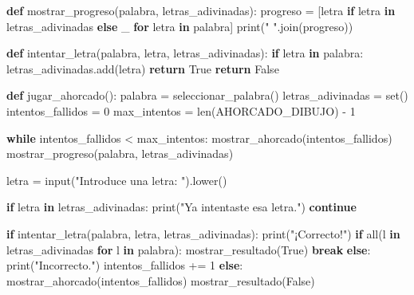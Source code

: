 \documentclass[
  a4paper,
  DIV=11,
  numbers=noendperiod,
  onepage,
  openany]{scrreprt}
\newenvironment{Shaded}{\begin{snugshade}}{\end{snugshade}}
\newcommand{\BuiltInTok}[1]{\textcolor[rgb]{0.00,0.23,0.31}{#1}}
\newcommand{\ControlFlowTok}[1]{\textcolor[rgb]{0.00,0.23,0.31}{\textbf{#1}}}
\newcommand{\DecValTok}[1]{\textcolor[rgb]{0.68,0.00,0.00}{#1}}
\newcommand{\KeywordTok}[1]{\textcolor[rgb]{0.00,0.23,0.31}{\textbf{#1}}}
\newcommand{\NormalTok}[1]{\textcolor[rgb]{0.00,0.23,0.31}{#1}}
\newcommand{\OperatorTok}[1]{\textcolor[rgb]{0.37,0.37,0.37}{#1}}
\newcommand{\StringTok}[1]{\textcolor[rgb]{0.13,0.47,0.30}{#1}}
\newcommand{\VariableTok}[1]{\textcolor[rgb]{0.07,0.07,0.07}{#1}}
\begin{document}
\begin{Shaded}
\begin{Highlighting}[]
\KeywordTok{def}\NormalTok{ mostrar\_progreso(palabra, letras\_adivinadas):}
\NormalTok{    progreso }\OperatorTok{=}\NormalTok{ [letra }\ControlFlowTok{if}\NormalTok{ letra }\KeywordTok{in}\NormalTok{ letras\_adivinadas }\ControlFlowTok{else} \StringTok{\textquotesingle{}\_\textquotesingle{}} \ControlFlowTok{for}\NormalTok{ letra }\KeywordTok{in}\NormalTok{ palabra]}
    \BuiltInTok{print}\NormalTok{(}\StringTok{" "}\NormalTok{.join(progreso))}

\KeywordTok{def}\NormalTok{ intentar\_letra(palabra, letra, letras\_adivinadas):}
    \ControlFlowTok{if}\NormalTok{ letra }\KeywordTok{in}\NormalTok{ palabra:}
\NormalTok{        letras\_adivinadas.add(letra)}
        \ControlFlowTok{return} \VariableTok{True}
    \ControlFlowTok{return} \VariableTok{False}

\KeywordTok{def}\NormalTok{ jugar\_ahorcado():}
\NormalTok{    palabra }\OperatorTok{=}\NormalTok{ seleccionar\_palabra()}
\NormalTok{    letras\_adivinadas }\OperatorTok{=} \BuiltInTok{set}\NormalTok{()}
\NormalTok{    intentos\_fallidos }\OperatorTok{=} \DecValTok{0}
\NormalTok{    max\_intentos }\OperatorTok{=} \BuiltInTok{len}\NormalTok{(AHORCADO\_DIBUJO) }\OperatorTok{{-}} \DecValTok{1}

    \ControlFlowTok{while}\NormalTok{ intentos\_fallidos }\OperatorTok{\textless{}}\NormalTok{ max\_intentos:}
\NormalTok{        mostrar\_ahorcado(intentos\_fallidos)}
\NormalTok{        mostrar\_progreso(palabra, letras\_adivinadas)}
        
\NormalTok{        letra }\OperatorTok{=} \BuiltInTok{input}\NormalTok{(}\StringTok{"Introduce una letra: "}\NormalTok{).lower()}
        
        \ControlFlowTok{if}\NormalTok{ letra }\KeywordTok{in}\NormalTok{ letras\_adivinadas:}
            \BuiltInTok{print}\NormalTok{(}\StringTok{"Ya intentaste esa letra."}\NormalTok{)}
            \ControlFlowTok{continue}
        
        \ControlFlowTok{if}\NormalTok{ intentar\_letra(palabra, letra, letras\_adivinadas):}
            \BuiltInTok{print}\NormalTok{(}\StringTok{"¡Correcto!"}\NormalTok{)}
            \ControlFlowTok{if} \BuiltInTok{all}\NormalTok{(l }\KeywordTok{in}\NormalTok{ letras\_adivinadas }\ControlFlowTok{for}\NormalTok{ l }\KeywordTok{in}\NormalTok{ palabra):}
\NormalTok{                mostrar\_resultado(}\VariableTok{True}\NormalTok{)}
                \ControlFlowTok{break}
        \ControlFlowTok{else}\NormalTok{:}
            \BuiltInTok{print}\NormalTok{(}\StringTok{"Incorrecto."}\NormalTok{)}
\NormalTok{            intentos\_fallidos }\OperatorTok{+=} \DecValTok{1}
    \ControlFlowTok{else}\NormalTok{:}
\NormalTok{        mostrar\_ahorcado(intentos\_fallidos)}
\NormalTok{        mostrar\_resultado(}\VariableTok{False}\NormalTok{)}


\end{Highlighting}
\end{Shaded}
\end{document}
